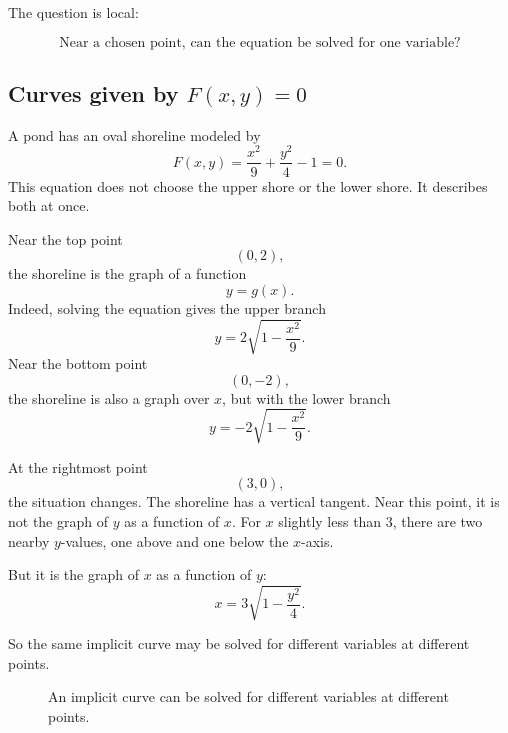 The question is local:

\[
    \text{Near a chosen point, can the equation be solved for one variable?}
\]

\subsection{Curves given by \texorpdfstring{\(F(x,y)=0\)}{F(x,y)=0}}

A pond has an oval shoreline modeled by
\[
    F(x,y)=\frac{x^2}{9}+\frac{y^2}{4}-1=0.
\]
This equation does not choose the upper shore or the lower shore.  It describes both at
once.

Near the top point
\[
    (0,2),
\]
the shoreline is the graph of a function
\[
    y=g(x).
\]
Indeed, solving the equation gives the upper branch
\[
    y=2\sqrt{1-\frac{x^2}{9}}.
\]
Near the bottom point
\[
    (0,-2),
\]
the shoreline is also a graph over \(x\), but with the lower branch
\[
    y=-2\sqrt{1-\frac{x^2}{9}}.
\]

At the rightmost point
\[
    (3,0),
\]
the situation changes.  The shoreline has a vertical tangent.  Near this point, it is not
the graph of \(y\) as a function of \(x\).  For \(x\) slightly less than \(3\), there are two
nearby \(y\)-values, one above and one below the \(x\)-axis.

But it is the graph of \(x\) as a function of \(y\):
\[
    x=3\sqrt{1-\frac{y^2}{4}}.
\]

So the same implicit curve may be solved for different variables at different points.

\begin{figure}[h]
\centering
{}
\caption{An implicit curve can be solved for different variables at different points.}
\end{figure}


